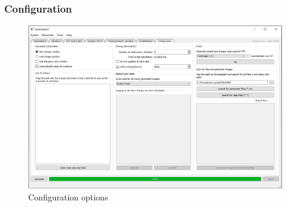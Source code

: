 \documentclass[11pt]{article} %
\begin{document}
\subsubsection{Configuration}
\begin{figure}[H]
 \centering
 \includegraphics[width=\textwidth]{gui-config.png}
 \caption{Configuration options}
\end{figure}
\end{document}
